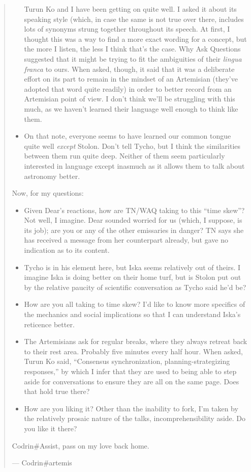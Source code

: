 \begin{quote}
\begin{itemize}
  Turun Ko and I have been getting on quite well. I asked it about its speaking style (which, in case the same is not true over there, includes lots of synonyms strung together throughout its speech. At first, I thought this was a way to find a more exact wording for a concept, but the more I listen, the less I think that's the case. Why Ask Questions suggested that it might be trying to fit the ambiguities of their \emph{lingua franca} to ours. When asked, though, it said that it was a deliberate effort on its part to remain in the mindset of an Artemisian (they've adopted that word quite readily) in order to better record from an Artemisian point of view. I don't think we'll be struggling with this much, as we haven't learned their language well enough to think like them.
\item
  On that note, everyone seems to have learned our common tongue quite well \emph{except} Stolon. Don't tell Tycho, but I think the similarities between them run quite deep. Neither of them seem particularly interested in language except inasmuch as it allows them to talk about astronomy better.
\end{itemize}

Now, for my questions:

\begin{itemize}
\tightlist
\item
  Given Dear's reactions, how are TN/WAQ taking to this ``time skew''? Not well, I imagine. Dear sounded worried for us (which, I suppose, is its job); are you or any of the other emissaries in danger? TN says she has received a message from her counterpart already, but gave no indication as to its content.
\item
  Tycho is in his element here, but Iska seems relatively out of theirs. I imagine Iska is doing better on their home turf, but is Stolon put out by the relative paucity of scientific conversation as Tycho said he'd be?
\item
  How are you all taking to time skew? I'd like to know more specifics of the mechanics and social implications so that I can understand Iska's reticence better.
\item
  The Artemisians ask for regular breaks, where they always retreat back to their rest area. Probably five minutes every half hour. When asked, Turun Ko said, ``Consensus synchronization, planning-strategizing responses,'' by which I infer that they are used to being able to step aside for conversations to ensure they are all on the same page. Does that hold true there?
\item
  How are you liking it? Other than the inability to fork, I'm taken by the relatively prosaic nature of the talks, incomprehensibility aside. Do you like it there?
\end{itemize}

Codrin\#Assist, pass on my love back home.

— Codrin\#artemis
\end{quote}

